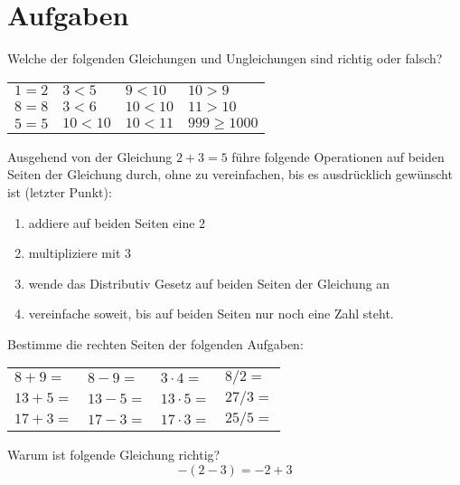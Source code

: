 \section{Aufgaben}

\begin{prob}
\label{arith.1.1}

Welche der folgenden Gleichungen und Ungleichungen sind richtig oder falsch?
\begin{center}
\begin{tabular}{C{2cm}C{2cm}C{2cm}C{2cm}}
$1=2$ & $3<5$ & $9<10$ & $10>9$ \\
$8=8$ & $3<6$ & $10<10$ & $11>10$ \\
$5=5$ & $10<10$ & $10<11$ & $999 \ge 1000$ 
\end{tabular}
\end{center}
\end{prob}

\begin{prob}
\label{arith.1.2}
Ausgehend von der Gleichung $2+3=5$ führe folgende Operationen auf beiden Seiten der Gleichung durch, ohne zu vereinfachen, bis es ausdrücklich gewünscht ist (letzter Punkt):
\begin{enumerate}
\item addiere auf beiden Seiten eine 2
\item multipliziere mit 3
\item wende das Distributiv Gesetz auf beiden Seiten der Gleichung an
\item vereinfache soweit, bis auf beiden Seiten nur noch eine Zahl steht.
\end{enumerate}
\end{prob}

\begin{prob}
\label{arith.1.3}

Bestimme die rechten Seiten der folgenden Aufgaben:
\begin{center}
\begin{tabular}{C{2cm}C{2cm}C{2cm}C{2cm}}
$8+9=$ & $8-9=$ & $3\cdot 4=$ & ${8/ 2}=$ \\
$13+5=$ & $13-5=$ & $13\cdot 5=$ & ${27/ 3}=$ \\
$17+3=$ & $17-3=$ & $17 \cdot 3=$ & ${25/ 5}=$ 
\end{tabular}
\end{center}
\end{prob}

\begin{prob}
\label{arith.1.4}
Warum ist folgende Gleichung richtig?
\[ -(2-3) = -2+3 \]
\end{prob}
